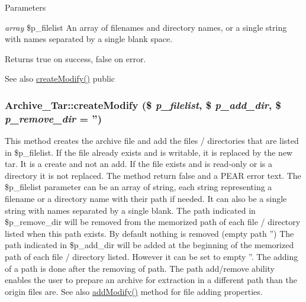 \begin{DoxyParams}{Parameters}
\item[{\em array}]\$p\_\-filelist An array of filenames and directory names, or a single string with names separated by a single blank space. \end{DoxyParams}
\begin{DoxyReturn}{Returns}
true on success, false on error. 
\end{DoxyReturn}
\begin{DoxySeeAlso}{See also}
\hyperlink{classArchive__Tar_accecf70468a22e87d19a927f6802b8f2}{createModify()}  public 
\end{DoxySeeAlso}
\hypertarget{classArchive__Tar_accecf70468a22e87d19a927f6802b8f2}{
\subsubsection[{createModify}]{\setlength{\rightskip}{0pt plus 5cm}Archive\_\-Tar::createModify (\$ {\em p\_\-filelist}, \/  \$ {\em p\_\-add\_\-dir}, \/  \$ {\em p\_\-remove\_\-dir} = {\ttfamily ''})}}
\label{classArchive__Tar_accecf70468a22e87d19a927f6802b8f2}
This method creates the archive file and add the files / directories that are listed in \$p\_\-filelist. If the file already exists and is writable, it is replaced by the new tar. It is a create and not an add. If the file exists and is read-\/only or is a directory it is not replaced. The method return false and a PEAR error text. The \$p\_\-filelist parameter can be an array of string, each string representing a filename or a directory name with their path if needed. It can also be a single string with names separated by a single blank. The path indicated in \$p\_\-remove\_\-dir will be removed from the memorized path of each file / directory listed when this path exists. By default nothing is removed (empty path '') The path indicated in \$p\_\-add\_\-dir will be added at the beginning of the memorized path of each file / directory listed. However it can be set to empty ''. The adding of a path is done after the removing of path. The path add/remove ability enables the user to prepare an archive for extraction in a different path than the origin files are. See also \hyperlink{classArchive__Tar_a87c8ae9ed359f1caf7d346649d9155a4}{addModify()} method for file adding properties.


